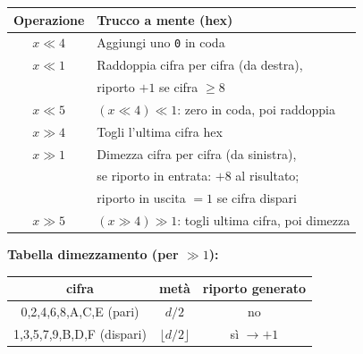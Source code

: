 \begin{center}
\renewcommand{\arraystretch}{1.3}
\begin{tabular}{|c|l|}
\hline
\textbf{Operazione} & \textbf{Trucco a mente (hex)} \\
\hline
$x \ll 4$ & Aggiungi uno \texttt{0} in coda \\
\hline
$x \ll 1$ & Raddoppia cifra per cifra (da destra), \\
 & riporto $+1$ se cifra $\geq 8$ \\
\hline
$x \ll 5$ & $(x\ll4)\ll1$: zero in coda, poi raddoppia \\
\hline
\hline
$x \gg 4$ & Togli l'ultima cifra hex \\
\hline
$x \gg 1$ & Dimezza cifra per cifra (da sinistra), \\
 & se riporto in entrata: $+8$ al risultato; \\
 & riporto in uscita $=1$ se cifra dispari \\
\hline
$x \gg 5$ & $(x\gg4)\gg1$: togli ultima cifra, poi dimezza \\
\hline
\end{tabular}
\end{center}

\textbf{Tabella dimezzamento (per $\gg 1$):}
\begin{center}
\begin{tabular}{|c|c|c|}
\hline
cifra & metà & riporto generato \\
\hline
0,2,4,6,8,A,C,E (pari) & $d/2$ & no \\
1,3,5,7,9,B,D,F (dispari) & $\lfloor d/2 \rfloor$ & sì $\to +1$ \\
\hline
\end{tabular}
\end{center}